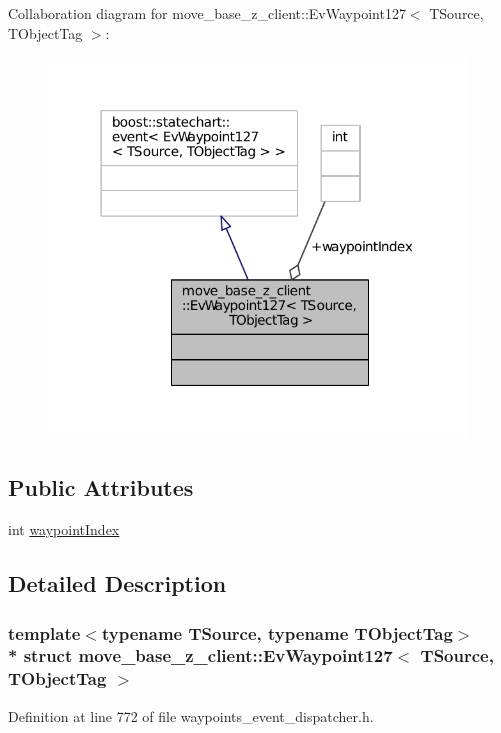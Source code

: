Collaboration diagram for move\+\_\+base\+\_\+z\+\_\+client\+:\+:Ev\+Waypoint127$<$ T\+Source, T\+Object\+Tag $>$\+:
\nopagebreak
\begin{figure}[H]
\begin{center}
\leavevmode
\includegraphics[width=314pt]{structmove__base__z__client_1_1EvWaypoint127__coll__graph}
\end{center}
\end{figure}
\subsection*{Public Attributes}
\begin{DoxyCompactItemize}
\item 
int \hyperlink{structmove__base__z__client_1_1EvWaypoint127_a66d99034348272d0f897623bf0d4b859}{waypoint\+Index}
\end{DoxyCompactItemize}


\subsection{Detailed Description}
\subsubsection*{template$<$typename T\+Source, typename T\+Object\+Tag$>$\\*
struct move\+\_\+base\+\_\+z\+\_\+client\+::\+Ev\+Waypoint127$<$ T\+Source, T\+Object\+Tag $>$}



Definition at line 772 of file waypoints\+\_\+event\+\_\+dispatcher.\+h.



